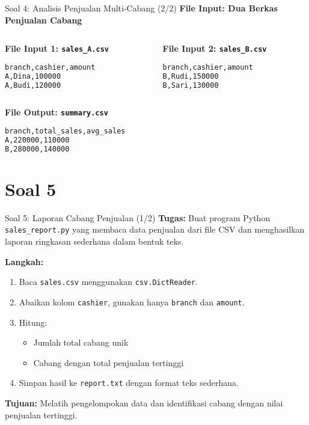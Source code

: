 \documentclass[aspectratio=169, table]{beamer}
\begin{document}
\begin{frame}[fragile]{Soal 4: Analisis Penjualan Multi-Cabang (2/2)}
\vspace{10pt}
\textbf{File Input: Dua Berkas Penjualan Cabang}

\begin{columns}[t]
  \begin{column}{0.48\textwidth}
  \textbf{File Input 1: \texttt{sales\_A.csv}}
  \begin{lstlisting}[language=bash,basicstyle=\ttfamily\small]
branch,cashier,amount
A,Dina,100000
A,Budi,120000
  \end{lstlisting}
  \end{column}

  \begin{column}{0.48\textwidth}
  \textbf{File Input 2: \texttt{sales\_B.csv}}
  \begin{lstlisting}[language=bash,basicstyle=\ttfamily\small]
branch,cashier,amount
B,Rudi,150000
B,Sari,130000
  \end{lstlisting}
  \end{column}
\end{columns}

\vspace{5pt}
\textbf{File Output: \texttt{summary.csv}}
\begin{lstlisting}[language=bash,basicstyle=\ttfamily\small]
branch,total_sales,avg_sales
A,220000,110000
B,280000,140000
\end{lstlisting}
\end{frame}



\section{Soal 5}
\begin{frame}[fragile]{Soal 5: Laporan Cabang Penjualan (1/2)}
\vspace{15pt}
\textbf{Tugas:}  
Buat program Python \texttt{sales\_report.py} yang membaca data penjualan dari file CSV dan menghasilkan laporan ringkasan sederhana dalam bentuk teks.

\textbf{Langkah:}
\begin{enumerate}
  \item Baca \texttt{sales.csv} menggunakan \texttt{csv.DictReader}.
  \item Abaikan kolom \texttt{cashier}, gunakan hanya \texttt{branch} dan \texttt{amount}.
  \item Hitung:
        \begin{itemize}
          \item Jumlah total cabang unik
          \item Cabang dengan total penjualan tertinggi
        \end{itemize}
  \item Simpan hasil ke \texttt{report.txt} dengan format teks sederhana.
\end{enumerate}

\textbf{Tujuan:}  
Melatih pengelompokan data dan identifikasi cabang dengan nilai penjualan tertinggi.
\end{frame}
\end{document}
